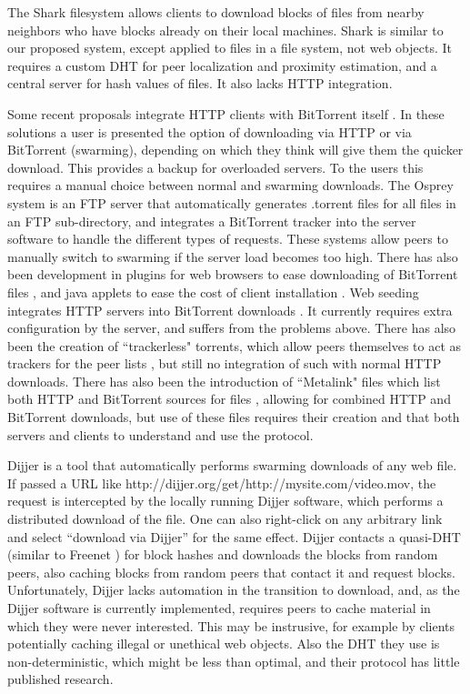 The Shark \cite{shark} filesystem allows clients to download blocks of files from nearby neighbors who have blocks already on their local machines.  
Shark is similar to our proposed system, except applied to files in a file system, not web objects.  It  requires a custom DHT for peer localization and proximity estimation, 
and a central server for hash values of files.  It also lacks HTTP integration.

Some recent proposals integrate HTTP clients with BitTorrent itself \cite{webtorrent}.  In these solutions a user is presented the option of downloading via HTTP or via BitTorrent (swarming), 
depending on which they think will give them the quicker download.  This provides a backup for overloaded servers.  To the users this requires a manual choice between normal and 
swarming downloads.  
The Osprey system \cite{osprey} is an FTP server that automatically generates .torrent files for all files in an FTP sub-directory, 
and integrates a BitTorrent tracker into the server software to handle the different types of requests.  
These systems allow peers to manually switch to swarming if the server load becomes too high.  
There has also been development in plugins for web browsers to ease downloading of BitTorrent files \cite{opera, foxtorrent}, and java applets to ease the cost of client installation \cite{bitlet}.
Web seeding integrates HTTP servers into BitTorrent downloads \cite{bittorrent_wikipedia}.  It currently requires extra configuration by the server, 
and suffers from the problems above.  There has also been the creation of ``trackerless" torrents, which allow peers themselves to act as trackers for the peer lists \cite{bittorrent_wikipedia}, but still no integration of such
with normal HTTP downloads.  There has also been the introduction of ``Metalink" files which list both HTTP and BitTorrent sources for files \cite{metalink_wikipedia}, 
allowing for combined HTTP and BitTorrent downloads, but use of these files requires their creation and that both servers and clients to understand and use the protocol.

Dijjer \cite{dijjer} is a tool that automatically performs swarming downloads of any web file.  
If passed a URL like http://dijjer.org/get/http://mysite.com/video.mov, the request is intercepted by the locally running Dijjer software, 
which performs a distributed download of the file.  One can also right-click on any arbitrary link and select ``download via Dijjer'' for the same effect. 
Dijjer contacts a quasi-DHT (similar to Freenet \cite{freenet}) for block hashes and downloads the blocks from random peers, 
also caching blocks from random peers that contact it and request blocks.  Unfortunately, Dijjer lacks automation in the transition to download, and, 
as the Dijjer software is currently implemented, requires peers to cache material in which they were never interested.
This may be instrusive, for example by clients potentially caching illegal or unethical web objects.  Also the DHT they use is non-deterministic, which might be less than optimal,
and their protocol has little published research.

